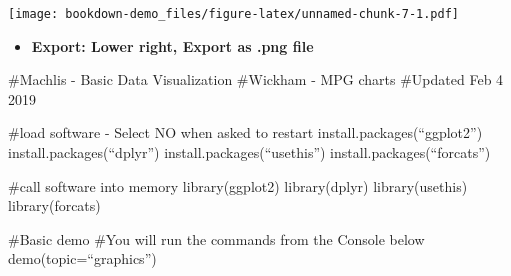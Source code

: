 \documentclass[]{book}
\newenvironment{Shaded}{\begin{snugshade}}{\end{snugshade}}
\newcommand{\DataTypeTok}[1]{\textcolor[rgb]{0.13,0.29,0.53}{#1}}
\newcommand{\KeywordTok}[1]{\textcolor[rgb]{0.13,0.29,0.53}{\textbf{#1}}}
\newcommand{\NormalTok}[1]{#1}
\newcommand{\OperatorTok}[1]{\textcolor[rgb]{0.81,0.36,0.00}{\textbf{#1}}}
\newcommand{\OtherTok}[1]{\textcolor[rgb]{0.56,0.35,0.01}{#1}}
\newcommand{\StringTok}[1]{\textcolor[rgb]{0.31,0.60,0.02}{#1}}
\providecommand{\tightlist}{%
  \setlength{\itemsep}{0pt}\setlength{\parskip}{0pt}}
\begin{document}
\begin{Shaded}
\end{Shaded}

\texttt{[image: bookdown-demo\_files/figure-latex/unnamed-chunk-7-1.pdf]}

\begin{itemize}
\tightlist
\item
  \textbf{Export: Lower right, Export as .png file}
\end{itemize}

\#Machlis - Basic Data Visualization
\#Wickham - MPG charts
\#Updated Feb 4 2019

\#load software - Select NO when asked to restart
install.packages(``ggplot2'')
install.packages(``dplyr'')
install.packages(``usethis'')
install.packages(``forcats'')

\#call software into memory
library(ggplot2)
library(dplyr)
library(usethis)
library(forcats)

\#Basic demo
\#You will run the commands from the Console below
demo(topic=``graphics'')
\end{document}
